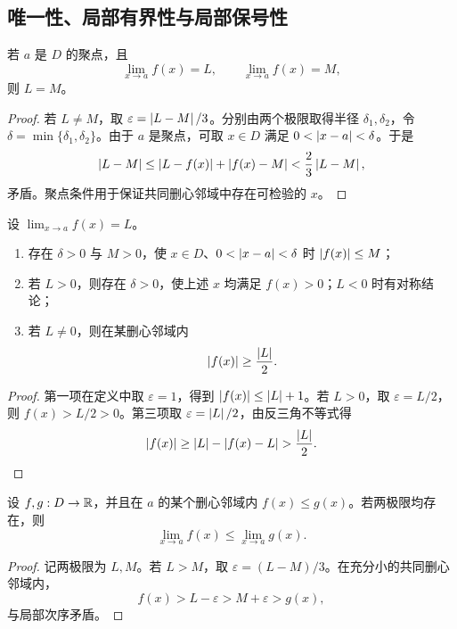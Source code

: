 \subsection{唯一性、局部有界性与局部保号性}

\begin{theorem}[唯一性]
若 \(a\) 是 \(D\) 的聚点，且
\[
 \lim_{x\to a}f(x)=L,\qquad \lim_{x\to a}f(x)=M,
\]
则 \(L=M\)。
\end{theorem}

\begin{proof}
若 \(L\ne M\)，取 \(\varepsilon=\left|L-M\right|/3\)。分别由两个极限取得半径 \(\delta_1,\delta_2\)，令 \(\delta=\min\{\delta_1,\delta_2\}\)。由于 \(a\) 是聚点，可取 \(x\in D\) 满足 \(0<\left|x-a\right|<\delta\)。于是
\[
 \left|L-M\right|\le\left|L-f(x)\right|+\left|f(x)-M\right|
 <\frac23\left|L-M\right|,
\]
矛盾。聚点条件用于保证共同删心邻域中存在可检验的 \(x\)。
\end{proof}

\begin{theorem}[局部有界性与局部保号性]
设 \(\lim_{x\to a}f(x)=L\)。
\begin{enumerate}
 \item 存在 \(\delta>0\) 与 \(M>0\)，使 \(x\in D\)、\(0<\left|x-a\right|<\delta\) 时 \(\left|f(x)\right|\le M\)；
 \item 若 \(L>0\)，则存在 \(\delta>0\)，使上述 \(x\) 均满足 \(f(x)>0\)；\(L<0\) 时有对称结论；
 \item 若 \(L\ne0\)，则在某删心邻域内
 \[
  \left|f(x)\right|\ge\frac{\left|L\right|}{2}.
 \]
\end{enumerate}
\end{theorem}

\begin{proof}
第一项在定义中取 \(\varepsilon=1\)，得到 \(\left|f(x)\right|\le\left|L\right|+1\)。若 \(L>0\)，取 \(\varepsilon=L/2\)，则 \(f(x)>L/2>0\)。第三项取 \(\varepsilon=\left|L\right|/2\)，由反三角不等式得
\[
 \abs{f(x)}\ge\abs L-\abs{f(x)-L}>\frac{\abs L}{2}.
\]
\end{proof}

\begin{proposition}[保序性]
设 \(f,g:D\to\mathbb{R}\)，并且在 \(a\) 的某个删心邻域内 \(f(x)\le g(x)\)。若两极限均存在，则
\[
 \lim_{x\to a}f(x)\le\lim_{x\to a}g(x).
\]
\end{proposition}

\begin{proof}
记两极限为 \(L,M\)。若 \(L>M\)，取 \(\varepsilon=(L-M)/3\)。在充分小的共同删心邻域内，
\[
 f(x)>L-\varepsilon>M+\varepsilon>g(x),
\]
与局部次序矛盾。
\end{proof}

